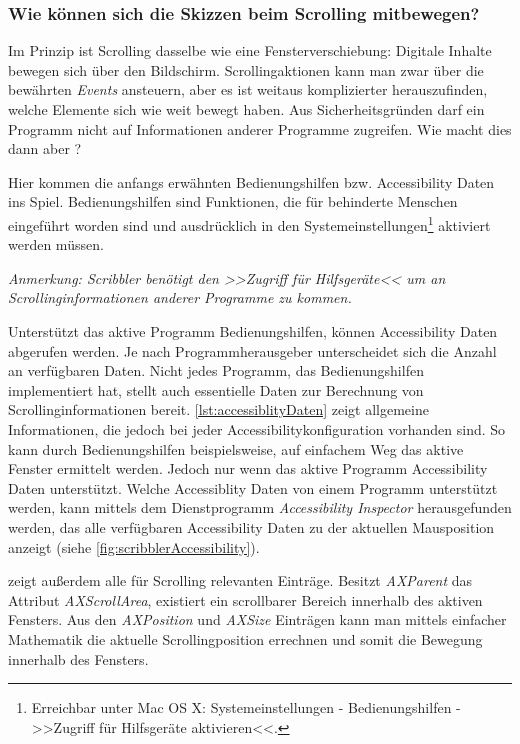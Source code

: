 \subsubsection* {Wie können sich die Skizzen beim Scrolling mitbewegen?}
Im Prinzip ist Scrolling dasselbe wie eine Fensterverschiebung: Digitale Inhalte bewegen sich über den Bildschirm. Scrollingaktionen kann man zwar über die bewährten \emph{Events} ansteuern, aber es ist weitaus komplizierter herauszufinden, welche Elemente sich wie weit bewegt haben. Aus Sicherheitsgründen darf ein Programm nicht auf Informationen anderer Programme zugreifen. Wie macht dies dann aber \scribbler?

Hier kommen die anfangs erwähnten Bedienungshilfen bzw. Accessibility Daten ins Spiel. Bedienungshilfen sind Funktionen, die für behinderte Menschen eingeführt worden sind und ausdrücklich in den Systemeinstellungen\footnote{Erreichbar unter Mac OS X: Systemeinstellungen - Bedienungshilfen - >>Zugriff für Hilfsgeräte aktivieren<<.} aktiviert werden müssen. 

\bigskip \emph{Anmerkung: \graffito{\(\clubsuit\)} Scribbler benötigt den >>Zugriff für Hilfsgeräte<< um an Scrollinginformationen anderer Programme zu kommen.}
\bigskip

Unterstützt das aktive Programm Bedienungshilfen, können Accessibility Daten abgerufen werden. Je nach Programmherausgeber unterscheidet sich die Anzahl an verfügbaren Daten. Nicht jedes Programm, das Bedienungshilfen implementiert hat, stellt auch essentielle Daten zur Berechnung von Scrollinginformationen bereit. \autoref{lst:accessiblityDaten} zeigt allgemeine Informationen, die jedoch bei jeder Accessibilitykonfiguration vorhanden sind. So kann durch Bedienungshilfen beispielsweise, auf einfachem Weg das aktive Fenster ermittelt werden. Jedoch nur wenn das aktive Programm Accessibility Daten unterstützt. Welche Accessiblity Daten von einem Programm unterstützt werden, kann mittels dem Dienstprogramm \emph{Accessibility Inspector} herausgefunden werden, das alle verfügbaren Accessibility Daten zu der aktuellen Mausposition anzeigt (siehe \autoref{fig:scribblerAccessibility}). 

 zeigt außerdem alle für Scrolling relevanten Einträge. Besitzt \emph{AXParent} das Attribut \emph{AXScrollArea}, existiert ein scrollbarer Bereich innerhalb des aktiven Fensters. Aus den \emph{AXPosition} und \emph{AXSize} Einträgen kann man mittels einfacher Mathematik die aktuelle Scrollingposition errechnen und somit die Bewegung innerhalb des Fensters.

